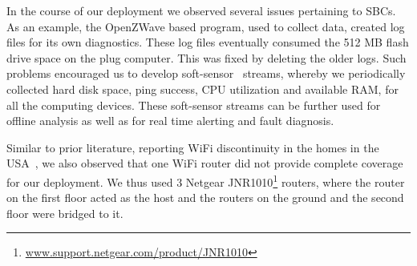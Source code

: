 \documentclass[10pt]{sensys-proc}
\newcommand{\figref}[1]{Figure~\ref{#1}}
\newcommand{\secref}[1]{Section~\ref{#1}}
\newcommand{\paradigm}{Sense Local-store Upload}
\begin{document}




In the course of our deployment we observed several issues pertaining to SBCs. As an example, the OpenZWave based program, used to collect data, created log files for its own diagnostics. These log files eventually consumed the 512 MB flash drive space on the plug computer. This was fixed by deleting the older logs. Such problems encouraged us to develop soft-sensor~\cite{softgreen} streams, whereby we periodically collected hard disk space, ping success, CPU utilization and available RAM, for all the computing devices. These soft-sensor streams can be further used for offline analysis as well as for real time alerting and fault diagnosis. %

Similar to prior literature, reporting WiFi discontinuity in the homes in the USA~\cite{hitchhiker_residential}, we also observed that one WiFi router did not provide complete coverage for our deployment. We thus used 3 Netgear JNR1010\footnote{\url{www.support.netgear.com/product/JNR1010}} routers, where the router on the first floor acted as the host and the routers on the ground and the second floor were bridged to it. %
\end{document}
